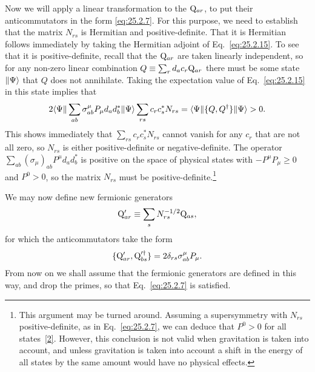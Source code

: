 Now we will apply a linear transformation to the \(\mathrm{Q}_{ar}\), to put
their anticommutators in the form \eqref{eq:25.2.7}. For this purpose, we
need to establish that the matrix \(N_{rs}\) is Hermitian and
positive-definite. That it is Hermitian follows immediately by taking the
Hermitian adjoint of Eq.~\eqref{eq:25.2.15}. To see that it is
positive-definite, recall that the \(\mathrm{Q}_{ar}\) are taken linearly
independent, so for any non-zero linear combination
\(Q\equiv\sum_r d_a c_r\mathrm{Q}_{ar}\) there must be some state
\(\lVert \Psi\rangle\) that \(Q\) does not annihilate. Taking the expectation
value of Eq.~\eqref{eq:25.2.15} in this state implies that
\[
2\langle \Psi\rVert
\sum_{ab}\sigma^\mu_{ab}P_\mu d_a d_b^*
\lVert \Psi\rangle
\sum_{rs}c_rc_s^*N_{rs}
=\langle \Psi\rVert\{Q,Q^\dagger\}\lVert \Psi\rangle>0.
\]
This shows immediately that \(\sum_{rs}c_rc_s^*N_{rs}\) cannot vanish for
any \(c_r\) that are not all zero, so \(N_{rs}\) is either
positive-definite or negative-definite. The operator
\(\sum_{ab}(\sigma_\mu)_{ab}P^\mu d_ad_b^*\) is positive on the space of
physical states with \(-P^\mu P_\mu\geq0\) and \(P^0>0\), so the matrix
\(N_{rs}\) must be positive-definite.\footnote{This argument may be turned
around. Assuming a supersymmetry with \(N_{rs}\) positive-definite, as in
Eq.~\eqref{eq:25.2.7}, we can deduce that \(P^0>0\) for all
states~\hyperref[ch25-ref-2]{[2]}. However, this conclusion is not valid
when gravitation is taken into account, and unless gravitation is taken
into account a shift in the energy of all states by the same amount would
have no physical effects.}

We may now define new fermionic generators
\[
\mathrm{Q}'_{ar}\equiv\sum_sN^{-1/2}_{rs}\mathrm{Q}_{as},
\]
for which the anticommutators take the form
\[
\{\mathrm{Q}'_{ar},\mathrm{Q}_{bs}^{\prime\dagger}\}
=2\delta_{rs}\sigma^\mu_{ab}P_\mu.
\]
From now on we shall assume that the fermionic generators are defined in
this way, and drop the primes, so that Eq.~\eqref{eq:25.2.7} is satisfied.

